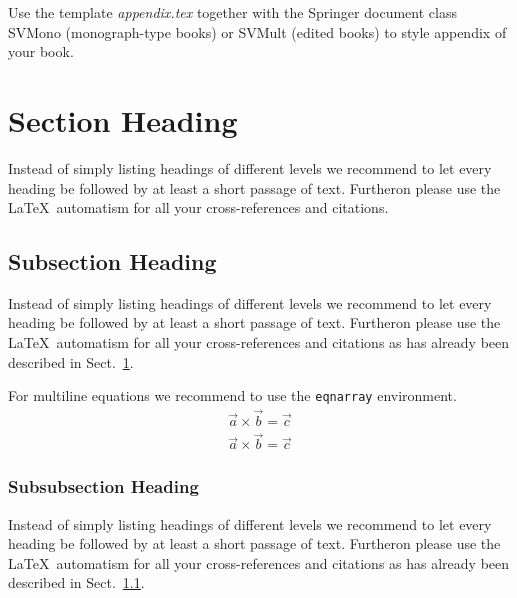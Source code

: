 \appendix
{}
Use the template \emph{appendix.tex} together with the Springer document class SVMono (monograph-type books) or SVMult (edited books) to style appendix of your book.


\section{Section Heading}
\label{sec:A1}
Instead of simply listing headings of different levels we recommend to let every heading be followed by at least a short passage of text. Furtheron please use the \LaTeX\ automatism for all your cross-references and citations.


\subsection{Subsection Heading}
\label{sec:A2}
Instead of simply listing headings of different levels we recommend to let every heading be followed by at least a short passage of text. Furtheron please use the \LaTeX\ automatism for all your cross-references and citations as has already been described in Sect.~\ref{sec:A1}.

For multiline equations we recommend to use the \verb|eqnarray| environment.
\begin{eqnarray}
\vec{a}\times\vec{b}=\vec{c} \nonumber\\
\vec{a}\times\vec{b}=\vec{c}
\label{eq:A01}
\end{eqnarray}

\subsubsection{Subsubsection Heading}
Instead of simply listing headings of different levels we recommend to let every heading be followed by at least a short passage of text. Furtheron please use the \LaTeX\ automatism for all your cross-references and citations as has already been described in Sect.~\ref{sec:A2}.

